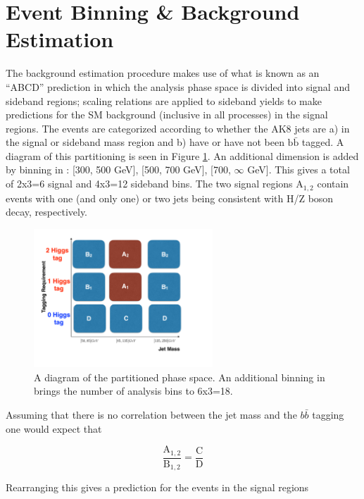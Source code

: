 \section{Event Binning \& Background Estimation}

The background estimation procedure makes use of what is known as an ``ABCD'' prediction in which the analysis phase space is divided into signal and sideband regions; scaling relations are applied to sideband yields to make predictions for the SM background (inclusive in all processes) in the signal regions. The events are categorized according to whether the AK8 jets are a) in the signal or sideband mass region and b) have or have not been $\mathrm{b}\bar{\mathrm{b}}$ tagged.  A diagram of this partitioning is seen in Figure \ref{fig:abcd}. An additional dimension is added by binning in \ptmiss: [300, 500 GeV], [500, 700 GeV], [700, $\infty$ GeV]. This gives a total of 2x3=6 signal and 4x3=12 sideband bins. The two signal regions $\mathrm{A}_{1, 2}$ contain events with one (and only one) or two jets being consistent with H/Z boson decay, respectively.

\begin{figure}
\centering
\includegraphics[width=0.6\textwidth]{figs/SUS17006/CMS-SUS-17-006_Figure-aux_002.pdf}
\caption{A diagram of the partitioned phase space. An additional binning in \ptmiss brings the number of analysis bins to 6x3=18.}
\label{fig:abcd}
\end{figure}

Assuming that there is no correlation between the jet mass and the $b\bar{b}$ tagging one would expect that

\begin{equation}
\frac{\mathrm{A}_{1, 2}}{\mathrm{B}_{1, 2}} = \frac{\mathrm{C}}{\mathrm{D}}
\end{equation}

Rearranging this gives a prediction for the events in the signal regions

